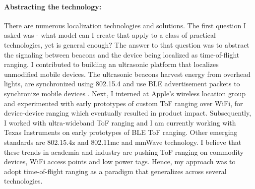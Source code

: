 \documentclass[10pt]{article}
\begin{document}

\paragraph{Abstracting the technology: }
There are numerous localization technologies and solutions. The first
question I asked was - what model can I create that apply to a class
of practical technologies, yet is general enough? The answer to that
question was to abstract the signaling between beacons and the device
being localized as time-of-flight ranging.
I contributed to building an ultrasonic platform that localizes
unmodified mobile devices. The ultrasonic beacons harvest energy from
overhead lights, are synchronized using 802.15.4 and use BLE
advertisement packets to synchronize mobile devices
\cite{rtas-alps-platform, lazik2015alps,lazik2015alpsdemo}. Next, I
interned at Apple's wireless location group and experimented with
early prototypes of custom ToF ranging over WiFi, for device-device
ranging which eventually resulted in product impact. Subsequently, I
worked with ultra-wideband ToF ranging and I am currently working with
Texas Instruments on early prototypes of BLE ToF ranging. Other
emerging standards are 802.15.4z and 802.11mc and mmWave technology. I
believe that these trends in academia and industry are pushing ToF
ranging on commodity devices, WiFi access points and low power
tags. Hence, my approach was to adopt time-of-flight ranging as a
paradigm that generalizes across several technologies.

\end{document}
